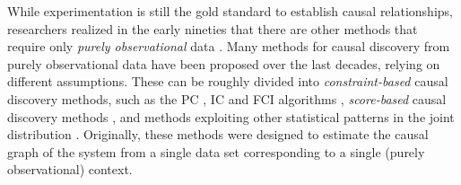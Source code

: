 \documentclass[twoside,11pt]{article}
\begin{document}
While experimentation is still the gold standard to establish causal relationships,
researchers realized in the early nineties that there are other methods that require
only \emph{purely observational} data \citep{SGS2000,Pearl2009}. Many methods for causal
discovery from purely observational data have been proposed over the last decades,
relying on different assumptions.
These can be roughly divided into \emph{constraint-based} causal discovery methods, 
such as the PC \citep{SGS2000}, IC \citep{Pearl2009} and FCI algorithms \citep{SMR1999,Zhang2008_AI},
\emph{score-based} causal discovery methods \citep[e.g.,][]{CooperHerskovits1992,HGC1995,Chickering2002,KoivistoSood2004}, 
and methods exploiting other statistical patterns in the joint distribution \citep[e.g.,][]{Mooij++_JMLR_16,PJS2017}.
Originally, these methods were designed to estimate the causal graph of the system 
from a single data set corresponding to a single (purely observational) context.
\end{document}
